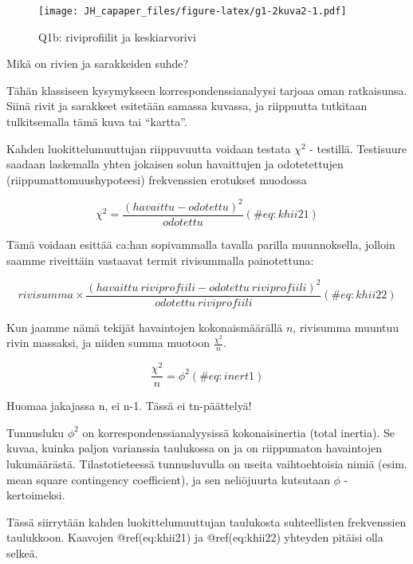 \documentclass[
  finnish,
]{book}
\begin{document}
\begin{figure}
\centering
\texttt{[image: JH\_capaper\_files/figure-latex/g1-2kuva2-1.pdf]}
\caption{Q1b: riviprofiilit ja keskiarvorivi}
\end{figure}

Mikä on rivien ja sarakkeiden suhde?

Tähän klassiseen kysymykseen korrespondenssianalyysi tarjoaa oman
ratkaisunsa. Siinä rivit ja sarakkeet esitetään samassa kuvassa, ja
riippuutta tutkitaan tulkitsemalla tämä kuva tai ``kartta''.

Kahden luokittelumuuttujan riippuvuutta voidaan testata \(\chi^{2}\) -
testillä. Testisuure saadaan laskemalla yhten jokaisen solun havaittujen
ja odotetettujen (riippumattomuushypoteesi) frekvenssien erotukset
muodossa

\begin{equation}
  \chi^{2} = \frac{(havaittu - odotettu)^2} {odotettu}
    (\#eq:khii21)
\end{equation}

Tämä voidaan esittää ca:han sopivammalla tavalla parilla muunnoksella,
jolloin saamme riveittäin vastaavat termit rivisummalla painotettuna:

\begin{equation}
  rivisumma \times \frac{(havaittu \: riviprofiili - odotettu \: riviprofiili)^2} {odotettu \: riviprofiili}
    (\#eq:khii22)
\end{equation}

Kun jaamme nämä tekijät havaintojen kokonaismäärällä \(n\), rivisumma
muuntuu rivin massaksi, ja niiden summa muotoon \(\frac{\chi^{2}}{n}\).

\begin{equation}
 \frac{\chi^{2}}{n} = \phi^{2}
  (\#eq:inert1)
 \end{equation}

Huomaa jakajassa n, ei n-1. Tässä ei tn-päättelyä!

Tunnusluku \(\phi^{2}\) on korrespondenssianalyysissä kokonaisinertia
(total inertia). Se kuvaa, kuinka paljon varianssia taulukossa on ja on
riippumaton havaintojen lukumäärästä. Tilastotieteessä tunnusluvulla on
useita vaihtoehtoisia nimiä (esim. mean square contingency coefficient),
ja sen neliöjuurta kutsutaan \(\phi\) - kertoimeksi.

Tässä siirrytään kahden luokittelumuuttujan taulukosta suhteellisten
frekvenssien taulukkoon. Kaavojen @ref(eq:khii21) ja @ref(eq:khii22)
yhteyden pitäisi olla selkeä.
\end{document}
